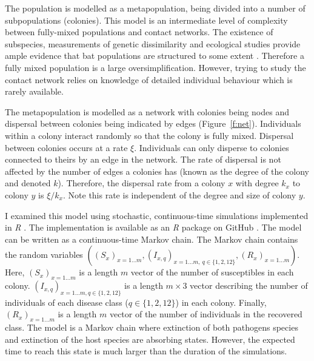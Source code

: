 

The population is modelled as a metapopulation, being divided into a number of subpopulations (colonies).
This model is an intermediate level of complexity between fully-mixed populations and contact networks.
The existence of subspecies, measurements of genetic dissimilarity and ecological studies provide ample evidence that bat populations are structured to some extent \cite{kerth2011bats, mccracken1981social, burns2014correlates, wilson2005mammal}.
Therefore a fully mixed population is a large oversimplification.
However, trying to study the contact network relies on knowledge of detailed individual behaviour which is rarely available.		

The metapopulation is modelled as a network with colonies being nodes and dispersal between colonies being indicated by edges (Figure~\ref{f:net}).
Individuals within a colony interact randomly so that the colony is fully mixed.
Dispersal between colonies occurs at a rate $\xi$.
Individuals can only disperse to colonies connected to theirs by an edge in the network.
The rate of dispersal is not affected by the number of edges a colonies has (known as the degree of the colony and denoted $k$).
Therefore, the dispersal rate from a colony $x$ with degree $k_x$ to colony $y$ is $\xi / k_x$.
Note this rate is independent of the degree and size of colony $y$.




I examined this model using stochastic, continuous-time simulations implemented in \emph{R} \cite{R}.
The implementation is available as an \emph{R} package on GitHub \cite{metapopepi}.
The model can be written as a continuous-time Markov chain.
The Markov chain contains the random variables $((S_x)_{x = 1\ldots m}, (I_{x, q})_{x =1\ldots m,\:q \in \{1, 2, 12\}}, (R_x)_{x = 1\ldots m})$.
Here, $(S_x)_{x = 1\ldots m}$ is a length $m$ vector of the number of susceptibles in each colony.
$(I_{x, q})_{x =1\ldots m, q \in \{1, 2, 12\}}$ is a length $m \times 3$ vector describing the number of individuals of each disease class ($q \in \{1, 2, 12\}$) in each colony.
Finally, $(R_x)_{x = 1\ldots m}$ is a length $m$ vector of the number of individuals in the recovered class.
The model is a Markov chain where extinction of both pathogens species and extinction of the host species are absorbing states.
However, the expected time to reach this state is much larger than the duration of the simulations.

